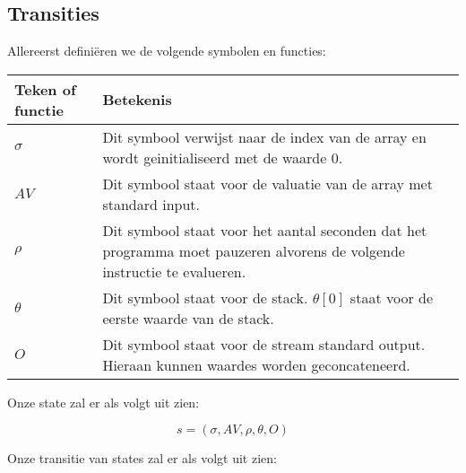 \documentclass[11pt]{article}
\begin{document}
\subsection{Transities}
Allereerst defini\"eren we de volgende symbolen en functies:
\newline
\newline
\begin{tabular}{ | l | p{12cm} |}
    \hline
    Teken of functie & Betekenis \\ \hline
    \begin{math} \sigma \end{math} &  Dit symbool verwijst naar de index van de array en wordt geinitialiseerd met de waarde 0. \\ \hline
    \begin{math} AV \end{math} & Dit symbool staat voor de valuatie van de array met standard input. \\ \hline
    \begin{math} \rho \end{math} &  Dit symbool staat voor het aantal seconden dat het programma moet pauzeren alvorens de volgende instructie te evalueren. \\ \hline
    \begin{math} \theta \end{math} & Dit symbool staat voor de stack. \begin{math}\theta[0]\end{math} staat voor de eerste waarde van de stack. \\ \hline
    \begin{math} O \end{math} &  Dit symbool staat voor de stream standard output. Hieraan kunnen waardes worden geconcateneerd. \\ \hline

\end{tabular}
\newline
\newline
\newline

Onze state zal er als volgt uit zien:

\[
s = (\sigma, AV, \rho, \theta, O)
\]

Onze transitie van states zal er als volgt uit zien:
\end{document}
